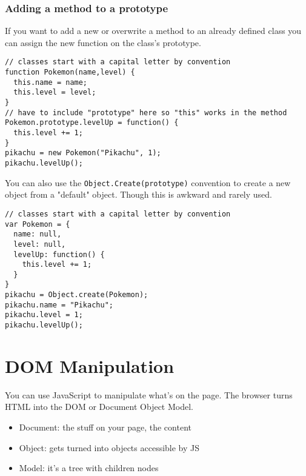 \documentclass[../CMPUT-404-Notes.tex]{subfiles}
\begin{document}
\subsubsection{Adding a method to a prototype}
If you want to add a new or overwrite a method to an already defined class you can assign the new function on the class's prototype.  
\begin{verbatim}
// classes start with a capital letter by convention
function Pokemon(name,level) {
  this.name = name;
  this.level = level;
}
// have to include "prototype" here so "this" works in the method
Pokemon.prototype.levelUp = function() {
  this.level += 1;
}
pikachu = new Pokemon("Pikachu", 1);
pikachu.levelUp();
\end{verbatim}

You can also use the \texttt{Object.Create(prototype)} convention to create a new object from a "default" object. Though this is awkward and rarely used.

\begin{verbatim}
// classes start with a capital letter by convention
var Pokemon = {
  name: null,
  level: null,
  levelUp: function() {
    this.level += 1;
  }
}
pikachu = Object.create(Pokemon);
pikachu.name = "Pikachu";
pikachu.level = 1;
pikachu.levelUp();
\end{verbatim}


\section{DOM Manipulation}
You can use JavaScript to manipulate what's on the page.
The browser turns HTML into the DOM or Document Object Model. 
\begin{itemize}
    \item Document: the stuff on your page, the content
    \item Object: gets turned into objects accessible by JS
    \item Model: it's a tree with children nodes
\end{itemize}
\end{document}
